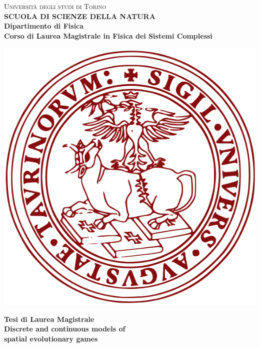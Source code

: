 \begin{titlepage}
\begin{center}
{{\Large{\textsc{Universit\`a degli studi di Torino \\}}}} \vspace{5mm} {\small{\bf SCUOLA DI SCIENZE DELLA NATURA\\ \vspace{2mm}
 Dipartimento di Fisica\\ \vspace{2mm} Corso di Laurea Magistrale in Fisica dei Sistemi Complessi}}
\vspace{5mm}
\end{center}
\begin{center}
\includegraphics[scale=.3]{head/logo.png}
\end{center}
\begin{center}
\vspace{5mm}
{\large{\bf Tesi di Laurea Magistrale\\}}
\vspace{5mm}
{\LARGE{\bf Discrete and continuous models of \\ spatial evolutionary games}}
\end{center}
\vspace{10mm}

\end{titlepage}
